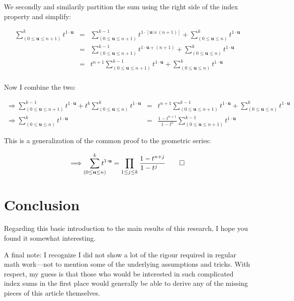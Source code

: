 \documentclass[twoside]{amsart}
\newcommand{\bu}[1][u]{\ensuremath{\mathbf #1}}
\begin{document}
We secondly and similarily partition the sum using the right side of the index property and simplify:

\begin{eqnarray*}
\sum_{(0\le\bu\le n+1)}^k\!\!\!\!\! t^{1\cdot\bu}           
 & = & \sum_{(0\le\bu\le n+1)}^{k-1}\!\!\!\!\! t^{1\cdot[\bu\uplus (n+1)]}
       +\sum_{(0\le\bu\le n)}^k\!\!\!\!\! t^{1\cdot\bu}                    \\
 & = & \sum_{(0\le\bu\le n+1)}^{k-1}\!\!\!\!\! t^{1\cdot\bu+(n+1)}         
       +\sum_{(0\le\bu\le n)}^k\!\!\!\!\! t^{1\cdot\bu}                    \\
 & = & t^{n+1}\sum_{(0\le\bu\le n+1)}^{k-1}\!\!\!\!\! t^{1\cdot\bu}        
       +\sum_{(0\le\bu\le n)}^k\!\!\!\!\! t^{1\cdot\bu}                    \\
\end{eqnarray*} 

Now I combine the two:

\begin{eqnarray*}
\Longrightarrow \sum_{(0\le\bu\le n+1)}^{k-1}\!\!\!\!\! t^{1\cdot\bu}
+t^k\sum_{(0\le\bu\le n)}^k\!\!\!\!\! t^{1\cdot\bu}
 & = & t^{n+1}\sum_{(0\le\bu\le n+1)}^{k-1}\!\!\!\!\! t^{1\cdot\bu}       
       +\sum_{(0\le\bu\le n)}^k\!\!\!\!\! t^{1\cdot\bu}                    \\
\Longrightarrow \sum_{(0\le\bu\le n)}^k\!\!\!\!\! t^{1\cdot\bu}
 & = & \frac{1-t^{n+1}}{1-t^k}
       \sum_{(0\le\bu\le n+1)}^{k-1}\!\!\!\!\! t^{1\cdot\bu}
\end{eqnarray*} 

This is a generalization of the common proof to the geometric series:

$$  \Longrightarrow\sum_{(0\le\bu\le n)}^k\!\!\!\!\! t^{1\cdot\bu}           
    =\prod_{1\le j\le k}\frac{1-t^{n+j}}{1-t^{j\ \ \ }}\qed  $$

\section{Conclusion}

Regarding this basic introduction to the main results of this research, I hope you found it somewhat interesting.

A final note: I recognize I did not show a lot of the rigour required in regular math work---not to mention some
of the underlying assumptions and tricks. With respect, my guess is that those who would be interested in such
complicated index sums in the first place would generally be able to derive any of the missing pieces of this article
themselves.
\end{document}
